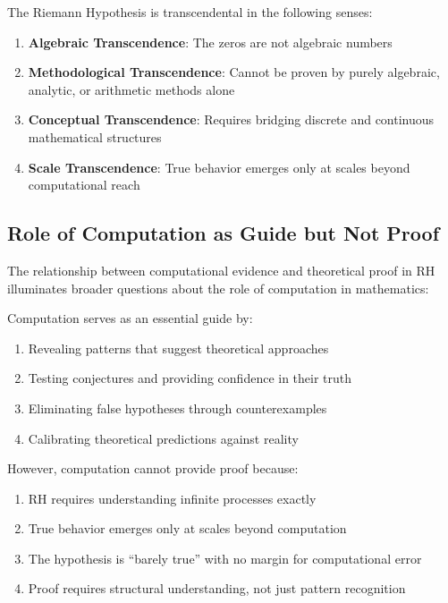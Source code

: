 \begin{theorem}[RH Transcendence]
The Riemann Hypothesis is transcendental in the following senses:
\begin{enumerate}
\item \textbf{Algebraic Transcendence}: The zeros are not algebraic numbers
\item \textbf{Methodological Transcendence}: Cannot be proven by purely algebraic, analytic, or arithmetic methods alone
\item \textbf{Conceptual Transcendence}: Requires bridging discrete and continuous mathematical structures
\item \textbf{Scale Transcendence}: True behavior emerges only at scales beyond computational reach
\end{enumerate}
\end{theorem}

\subsection{Role of Computation as Guide but Not Proof}
\label{subsec:computation_role}

The relationship between computational evidence and theoretical proof in RH illuminates broader questions about the role of computation in mathematics:

\begin{principle}
Computation serves as an essential guide by:
\begin{enumerate}
\item Revealing patterns that suggest theoretical approaches
\item Testing conjectures and providing confidence in their truth
\item Eliminating false hypotheses through counterexamples
\item Calibrating theoretical predictions against reality
\end{enumerate}
\end{principle}

\begin{principle}
However, computation cannot provide proof because:
\begin{enumerate}
\item RH requires understanding infinite processes exactly
\item True behavior emerges only at scales beyond computation
\item The hypothesis is ``barely true'' with no margin for computational error
\item Proof requires structural understanding, not just pattern recognition
\end{enumerate}
\end{principle}


